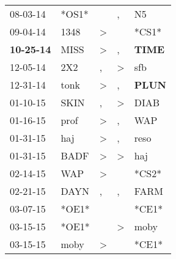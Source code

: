 \begin{supertabular}{p{0.07\textwidth}p{0.06\textwidth}p{0.02\textwidth}p{0.02\textwidth}p{0.06\textwidth}}
          08-03-14\textsuperscript{} &                            *OS1* &                  &                , &             N5\textsuperscript{} \\
          09-04-14\textsuperscript{} &           1348\textsuperscript{} &     \textgreater &                  &                            *CS1* \\
 \textbf{10-25-14\textsuperscript{}} &           MISS\textsuperscript{} &     \textgreater &                , &  \textbf{TIME\textsuperscript{}} \\
          12-05-14\textsuperscript{} &            2X2\textsuperscript{} &                , &     \textgreater &            sfb\textsuperscript{} \\
          12-31-14\textsuperscript{} &           tonk\textsuperscript{} &     \textgreater &                , &  \textbf{PLUN\textsuperscript{}} \\
          01-10-15\textsuperscript{} &           SKIN\textsuperscript{} &                , &     \textgreater &           DIAB\textsuperscript{} \\
          01-16-15\textsuperscript{} &           prof\textsuperscript{} &     \textgreater &                , &            WAP\textsuperscript{} \\
          01-31-15\textsuperscript{} &            haj\textsuperscript{} &     \textgreater &                , &           reso\textsuperscript{} \\
          01-31-15\textsuperscript{} &           BADF\textsuperscript{} &     \textgreater &     \textgreater &            haj\textsuperscript{} \\
          02-14-15\textsuperscript{} &            WAP\textsuperscript{} &     \textgreater &                  &                            *CS2* \\
          02-21-15\textsuperscript{} &           DAYN\textsuperscript{} &                , &                , &           FARM\textsuperscript{} \\
          03-07-15\textsuperscript{} &                            *OE1* &                  &                  &                            *CE1* \\
          03-15-15\textsuperscript{} &                            *OE1* &                  &     \textgreater &           moby\textsuperscript{} \\
          03-15-15\textsuperscript{} &           moby\textsuperscript{} &     \textgreater &                  &                            *CE1* \\

\end{supertabular}
